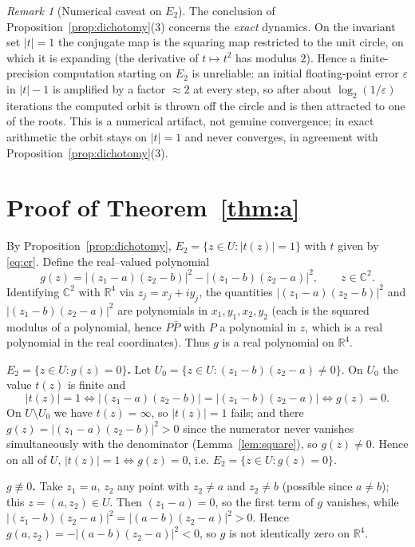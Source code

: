 \documentclass{amsart}
\theoremstyle{definition}
\theoremstyle{remark}
\newtheorem{remark}{Remark}
\newcommand{\C}{\mathbb{C}}
\newcommand{\R}{\mathbb{R}}
\begin{document}
\begin{remark}[Numerical caveat on $E_2$]
The conclusion of Proposition~\ref{prop:dichotomy}(3) concerns the \emph{exact} dynamics.
On the invariant set $|t|=1$ the conjugate map is the squaring map restricted to the unit
circle, on which it is expanding (the derivative of $t\mapsto t^2$ has modulus $2$). Hence a
finite-precision computation starting on $E_2$ is unreliable: an initial floating-point error
$\varepsilon$ in $|t|-1$ is amplified by a factor $\approx 2$ at every step, so after about
$\log_2(1/\varepsilon)$ iterations the computed orbit is thrown off the circle and is then
attracted to one of the roots. This is a numerical artifact, not genuine convergence; in exact
arithmetic the orbit stays on $|t|=1$ and never converges, in agreement with
Proposition~\ref{prop:dichotomy}(3).
\end{remark}

\section{Proof of Theorem~\ref{thm:a}}

By Proposition~\ref{prop:dichotomy}, $E_2=\{z\in U:|t(z)|=1\}$ with $t$ given by
\eqref{eq:cr}. Define the real--valued polynomial
\[
g(z)=\bigl|(z_1-a)(z_2-b)\bigr|^2-\bigl|(z_1-b)(z_2-a)\bigr|^2,\qquad z\in\C^2 .
\]
Identifying $\C^2$ with $\R^4$ via $z_j=x_j+iy_j$, the quantities $|(z_1-a)(z_2-b)|^2$ and
$|(z_1-b)(z_2-a)|^2$ are polynomials in $x_1,y_1,x_2,y_2$ (each is the squared modulus of a
polynomial, hence $P\bar P$ with $P$ a polynomial in $z$, which is a real polynomial in the
real coordinates). Thus $g$ is a real polynomial on $\R^4$.

\textbf{$E_2=\{z\in U:g(z)=0\}$.} Let $U_0=\{z\in U:(z_1-b)(z_2-a)\neq0\}$. On $U_0$ the
value $t(z)$ is finite and
\[
|t(z)|=1\iff \bigl|(z_1-a)(z_2-b)\bigr|=\bigl|(z_1-b)(z_2-a)\bigr|\iff g(z)=0 .
\]
On $U\setminus U_0$ we have $t(z)=\infty$, so $|t(z)|=1$ fails; and there
$g(z)=|(z_1-a)(z_2-b)|^2>0$ since the numerator never vanishes simultaneously with the
denominator (Lemma~\ref{lem:square}), so $g(z)\neq0$. Hence on all of $U$,
$|t(z)|=1\iff g(z)=0$, i.e. $E_2=\{z\in U:g(z)=0\}$.

\textbf{$g\not\equiv0$.} Take $z_1=a$, $z_2$ any point with $z_2\neq a$ and $z_2\neq b$
(possible since $a\neq b$); this $z=(a,z_2)\in U$. Then $(z_1-a)=0$, so the first term of
$g$ vanishes, while $|(z_1-b)(z_2-a)|^2=|(a-b)(z_2-a)|^2>0$. Hence
$g(a,z_2)=-|(a-b)(z_2-a)|^2<0$, so $g$ is not identically zero on $\R^4$.
\end{document}

